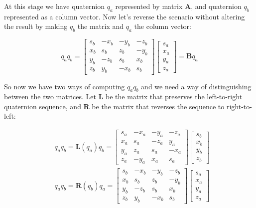 \documentclass[10pt]{article}
\begin{document}
At this stage we have quaternion $q_{a}$ represented by matrix $\mathbf{A}$, and quaternion $q_{b}$ represented as a column vector. Now let's reverse the scenario without altering the result by making $q_{b}$ the matrix and $q_{a}$ the column vector:

$$
q_{a} q_{b}=\left[\begin{array}{cccc}
s_{b} & -x_{b} & -y_{b} & -z_{b} \\
x_{b} & s_{b} & z_{b} & -y_{b} \\
y_{b} & -z_{b} & s_{b} & x_{b} \\
z_{b} & y_{b} & -x_{b} & s_{b}
\end{array}\right]\left[\begin{array}{c}
s_{a} \\
x_{a} \\
y_{a} \\
z_{a}
\end{array}\right]=\mathbf{B} q_{a}
$$

So now we have two ways of computing $q_{a} q_{b}$ and we need a way of distinguishing between the two matrices. Let $\mathbf{L}$ be the matrix that preserves the left-to-right quaternion sequence, and $\mathbf{R}$ be the matrix that reverses the sequence to right-to-left:

$$
\begin{aligned}
& q_{a} q_{b}=\mathbf{L}\left(q_{a}\right) q_{b}= {\left[\begin{array}{cccc}
s_{a} & -x_{a} & -y_{a} & -z_{a} \\
x_{a} & s_{a} & -z_{a} & y_{a} \\
y_{a} & z_{a} & s_{a} & -x_{a} \\
z_{a} & -y_{a} & x_{a} & s_{a}
\end{array}\right]\left[\begin{array}{l}
s_{b} \\
x_{b} \\
y_{b} \\
z_{b}
\end{array}\right] } \\
& q_{a} q_{b}=\mathbf{R}\left(q_{b}\right) q_{a}=\left[\begin{array}{cccc}
s_{b} & -x_{b} & -y_{b} & -z_{b} \\
x_{b} & s_{b} & z_{b} & -y_{b} \\
y_{b} & -z_{b} & s_{b} & x_{b} \\
z_{b} & y_{b} & -x_{b} & s_{b}
\end{array}\right]\left[\begin{array}{l}
s_{a} \\
x_{a} \\
y_{a} \\
z_{a}
\end{array}\right]
\end{aligned}
$$
\end{document}
